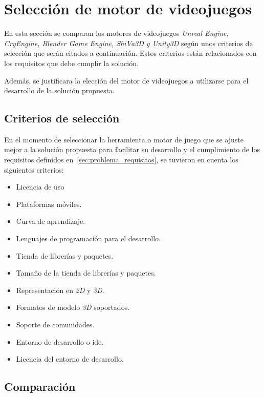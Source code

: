 \section{Selección de motor de videojuegos}
\label{sec:seleccion_plataforma}

En esta sección se comparan los motores de videojuegos \textit{Unreal Engine,
    CryEngine, Blender Game Engine, ShiVa3D y Unity3D} según unos criterios de
selección que serán citados a continuación. Estos criterios están relacionados
con los requisitos que debe cumplir la solución.

Además, se justificara la elección del motor de videojuegos a utilizarse para 
el desarrollo de la solución propuesta.

\subsection{Criterios de selección}

En el momento de seleccionar la herramienta o motor de juego que se ajuste mejor
a la solución propuesta para facilitar su desarrollo y el cumplimiento de los
requisitos definidos en~\ref{sec:problema_requisitos}, se tuvieron en cuenta los
siguientes criterios:


\begin{itemize}
\item Licencia de uso
\item Plataformas móviles.
\item Curva de aprendizaje.
\item Lenguajes de programación para el desarrollo.
\item Tienda de librerías y paquetes.
\item Tamaño de la tienda de librerías y paquetes.
\item Representación en \textit{2D} y \textit{3D}.
\item Formatos de modelo \textit{3D} soportados.
\item Soporte de comunidades.
\item Entorno de desarrollo o \Gls{ide}.
\item Licencia del entorno de desarrollo.
\end{itemize}


\subsection{Comparación}

